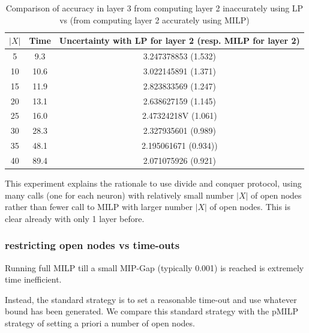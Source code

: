 \begin{table}[h!]
	\centering
	\begin{tabular}{|c|c|c|}
		\hline
		$|X|$ & Time &  Uncertainty with LP for layer 2 (resp. MILP for layer 2)\\ 
		\hline	5 & 9.3 & 3.247378853 (1.532)\\
		\hline	10 & 10.6 & 3.022145891 (1.371)\\
		\hline	15 & 11.9 & 2.823833569 (1.247)\\
		\hline	20 & 13.1 & 2.638627159 (1.145)\\
		\hline	25 & 16.0 & 2.47324218V (1.061)\\
		\hline	30 & 28.3 & 2.327935601 (0.989)\\
		\hline	35 & 48.1 & 2.195061671 (0.934))\\
		\hline	40 & 89.4 & 2.071075926 (0.921)\\	
		\hline

	\end{tabular}
	\caption{Comparison of accuracy in layer 3 from computing layer 2 inaccurately using LP vs (from computing layer 2 accurately using MILP)}
	\label{table15}
\end{table}
	
This experiment explains the rationale to use divide and conquer protocol, using many calls
(one for each neuron) with relatively small number $|X|$ of open nodes rather than fewer call to MILP with larger number $|X|$ of open nodes. This is clear already with only 1 layer before.


	




\subsubsection*{restricting open nodes vs time-outs}	

Running full MILP till a small MIP-Gap (typically 0.001) is reached is extremely time inefficient.

Instead, the standard strategy is to set a reasonable time-out and use whatever bound has been generated. We compare this standard strategy with the pMILP strategy of setting a priori a number of open nodes.

